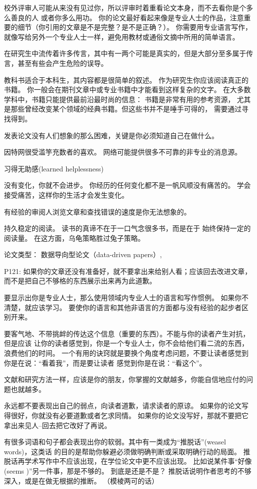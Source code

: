校外评审人可能从来没有见过你，所以评审时着重看论文本身，而不去看你是个多么善良的人
或者你多么用功。 你的论文最好看起来像是专业人士的作品，注意重要的细节（你引用的文章是不是完整？是不是正确？）。
你需要用专业语言写作，就像写给另外一个专业人士一样，避免用教材或通俗文摘中所用的简单语言。

在研究生中流传着许多传言，其中有一两个可能是真实的，但是大部分至多属于传言，甚至有些会产生危险的误导。

教科书适合于本科生，其内容都是很简单的叙述。
作为研究生你应该阅读真正的书籍。
你一般会在期刊文章中或专业书籍中才能看到这样复杂的文字。
在大多数学科中，书籍只能提供最前沿最时尚的信息： 书籍是非常有用的参考资源，
尤其是那些曾经改变某个领域的经典书籍。但这些书并不是唾手可得的，
需要通过寻找得到。

发表论文没有人们想象的那么困难，关键是你必须知道自己在做什么。

因特网很受滥竽充数者的喜欢。 网络可能提供很多不可靠的非专业的消息源。

习得无助感(learned helplessness)

没有变化，你就不会进步。 你经历的任何变化都不是一帆风顺没有痛苦的。
学会接受痛苦，这样你的生活才会发生变化。


有经验的审阅人浏览文章和查找错误的速度是你无法想象的。

持久稳定的阅读。 读书的真谛不在于一口气念很多书，而是在于
始终保持一定的阅读量。 
在这方面，乌龟策略胜过兔子策略。

论文类型： 数据导向型论文（data-driven papers）, 

P121:
如果你的文章还没有准备好，就不要拿出来给别人看；应该回去改进文章，而不是把自己不够格的东西展示出来再为此道歉。

要显示出你是专业人士，那么使用领域内专业人士的语言和写作惯例。
如果你不清楚，就应该学习。
要使你的语言和其他非语言的方面都与没有经验的起步者区别开来。

要客气地、不带挑衅的传达这个信息（重要的东西）。不能与你的读者产生对抗，但是应该
让你的读者感觉到，你是一个专业人士，你不会给他们看二流的东西，浪费他们的时间。
一个有用的诀窍就是要换个角度考虑问题，不要让读者感觉到你是在说：“看着我”，而是要让读者
感觉到你是在说：“看这个”。

文献和研究方法一样，应该是你的朋友，你掌握的文献越多，你能自信地应付的问题也就越多。

永远都不要表现出自己的弱点，向读者道歉，请求读者的原谅。
如果你的论文写得很好，你就没有必要道歉或者乞求同情。
如果你的论文没写好，那就不要把它拿出来见人--回去把它改好了再说。

有很多词语和句子都会表现出你的软弱。其中有一类成为“推脱话”(weasel words)，这类话
的目的是帮助你躲避必须做明确判断或采取明确行动的局面。
推脱话再学术写作中不应该出现，在学位论文中更不应该出现。
比如说某件事“好像(seems )”另一件事，那是不够的。
到底是还是不是？
推脱话说明作者思考的不够深入，或是在做无根据的推断。
（模棱两可的话）

